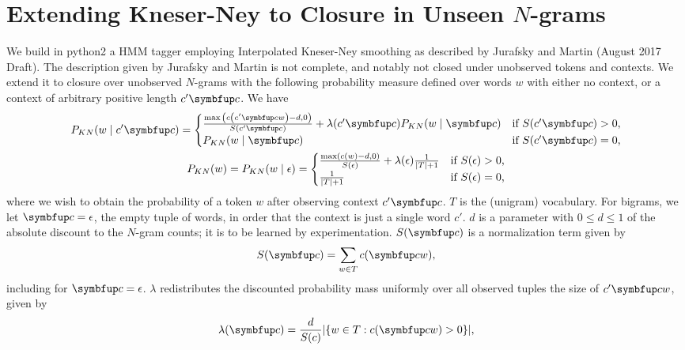 \documentclass[12pt,article,oneside,onecolumn,final,a4paper]{memoir}
\theoremstyle{myplain}
\theoremstyle{nonumbermyplain}
\theoremstyle{myplain}
\theoremstyle{nonumbermyplain}
\theoremstyle{nonumberproof}
\theoremstyle{nonumbersolution}
\numberwithin{equation}{chapter}
\begin{document}
\makeassignmenttitle{}

\setcounter{chapter}{1}

\setcounter{thm}{4}

\section{Extending Kneser-Ney to Closure in Unseen \(N\)-grams}

We build in python2 a HMM tagger employing Interpolated Kneser-Ney
smoothing as described by Jurafsky and Martin (August 2017 Draft). The
description given by Jurafsky and Martin is not complete, and notably
not closed under unobserved tokens and contexts. We extend it to
closure over unobserved \(N\)-grams with the following probability
measure defined over words \(w\) with either no context, or a context
of arbitrary positive length \(c'\w{c}\). We have
\begin{gather*}
  P_{KN}\p{w\mid c'\w{c}}=
  \begin{cases}
    \frac{\max{\p{c\p{c'\w{c}w}-d,0}}}{S\p{c'\w{c}}}
    +\lambda\p{c'\w{c}}P_{KN}\p{w\mid\w{c}} &
    \text{if \(S\p{c'\w{c}}>0\),}\\
    P_{KN}\p{w\mid\w{c}} &
    \text{if \(S\p{c'\w{c}}=0\),}\\
  \end{cases} \\
  P_{KN}\p{w}=P_{KN}\p{w\mid\epsilon}=
  \begin{cases}
    \frac{\max\p{c\p{w}-d,0}}{S\p{\epsilon}}+\lambda\p{\epsilon}\frac{1}{\abs{T}+1}
    &\text{if \(S\p{\epsilon}>0\),} \\
    \frac{1}{\abs{T}+1}&\text{if \(S\p{\epsilon}=0\),}
  \end{cases}
\end{gather*}
where we wish to obtain the probability of a token \(w\) after
observing context \(c'\w{c}\). \(T\) is the (unigram) vocabulary. For
bigrams, we let \(\w{c}=\epsilon\), the empty tuple of words, in order that
the context is just a single word \(c'\). \(d\) is a parameter with
\(0\leq d\leq 1\) of the absolute discount to the \(N\)-gram counts; it is
to be learned by experimentation. \(S\p{\w{c}}\) is a normalization
term given by
\begin{equation*}
  S\p{\w{c}}=\sum_{w\in T}c\p{\w{c}w},
\end{equation*}
including for \(\w{c}=\epsilon\). \(\lambda\) redistributes the discounted probability mass
uniformly over all observed tuples the size of \(c'\w{c}w\), given by
\begin{equation*}
  \lambda\p{\w{c}}=\frac{d}{S\p{c}}\abs{\B{w\in T:c\p{\w{c}w}>0}},
\end{equation*}
\end{document}
